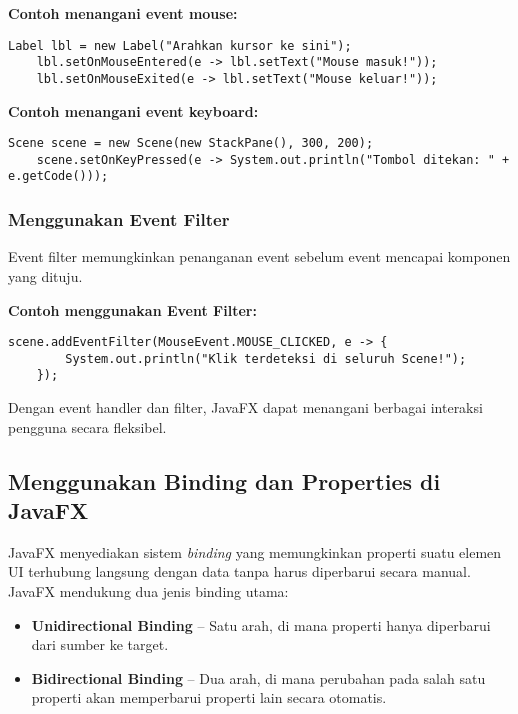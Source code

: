 \textbf{Contoh menangani event mouse:}
\begin{lstlisting}[style=JavaStyle, caption=Menggunakan event mouse dalam JavaFX]
	Label lbl = new Label("Arahkan kursor ke sini");
	lbl.setOnMouseEntered(e -> lbl.setText("Mouse masuk!"));
	lbl.setOnMouseExited(e -> lbl.setText("Mouse keluar!"));
\end{lstlisting}

\textbf{Contoh menangani event keyboard:}
\begin{lstlisting}[style=JavaStyle, caption=Menggunakan event keyboard dalam JavaFX]
	Scene scene = new Scene(new StackPane(), 300, 200);
	scene.setOnKeyPressed(e -> System.out.println("Tombol ditekan: " + e.getCode()));
\end{lstlisting}

\subsubsection{Menggunakan Event Filter}

Event filter memungkinkan penanganan event sebelum event mencapai komponen yang dituju.

\textbf{Contoh menggunakan Event Filter:}
\begin{lstlisting}[style=JavaStyle, caption=Menangani event sebelum mencapai target]
	scene.addEventFilter(MouseEvent.MOUSE_CLICKED, e -> {
		System.out.println("Klik terdeteksi di seluruh Scene!");
	});
\end{lstlisting}

Dengan event handler dan filter, JavaFX dapat menangani berbagai interaksi pengguna secara fleksibel.

\subsection{Menggunakan Binding dan Properties di JavaFX}

JavaFX menyediakan sistem \textit{binding} yang memungkinkan properti suatu elemen UI terhubung langsung dengan data tanpa harus diperbarui secara manual. JavaFX mendukung dua jenis binding utama:

\begin{itemize}
	\item \textbf{Unidirectional Binding} – Satu arah, di mana properti hanya diperbarui dari sumber ke target.
	\item \textbf{Bidirectional Binding} – Dua arah, di mana perubahan pada salah satu properti akan memperbarui properti lain secara otomatis.
\end{itemize}

